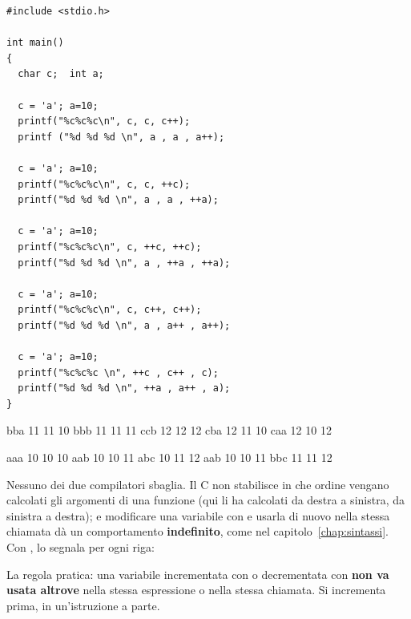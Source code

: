 \begin{affianco}[0.5][t]
\begin{lstlisting}[style=c, name=printf++.c]
#include <stdio.h>

int main()
{
  char c;  int a;

  c = 'a'; a=10;
  printf("%c%c%c\n", c, c, c++);
  printf ("%d %d %d \n", a , a , a++);

  c = 'a'; a=10;
  printf("%c%c%c\n", c, c, ++c);
  printf("%d %d %d \n", a , a , ++a);

  c = 'a'; a=10;
  printf("%c%c%c\n", c, ++c, ++c);
  printf("%d %d %d \n", a , ++a , ++a);

  c = 'a'; a=10;
  printf("%c%c%c\n", c, c++, c++);
  printf("%d %d %d \n", a , a++ , a++);

  c = 'a'; a=10;
  printf("%c%c%c \n", ++c , c++ , c);
  printf("%d %d %d \n", ++a , a++ , a);
}
\end{lstlisting}
\risultato
\begin{minipage}[t]{0.48\linewidth}
\begin{console}[gcc]
bba
11 11 10
bbb
11 11 11
ccb
12 12 12
cba
12 11 10
caa
12 10 12
\end{console}
\end{minipage}\hfill
\begin{minipage}[t]{0.48\linewidth}
\begin{console}[clang]
aaa
10 10 10
aab
10 10 11
abc
10 11 12
aab
10 10 11
bbc
11 11 12
\end{console}
\end{minipage}
\end{affianco}

Nessuno dei due compilatori sbaglia. Il C non stabilisce in che ordine
vengano calcolati gli argomenti di una funzione (qui  li ha
calcolati da destra a sinistra,  da sinistra a destra); e
modificare una variabile con \code{++} e usarla di nuovo nella stessa
chiamata dà un comportamento \textbf{indefinito}, come  nel
capitolo~\ref{chap:sintassi}. Con ,  lo segnala per
ogni riga:


La regola pratica: una variabile incrementata con \code{++} o decrementata
con \code{--} \textbf{non va usata altrove} nella stessa espressione o nella
stessa chiamata. Si incrementa prima, in un'istruzione a parte.


